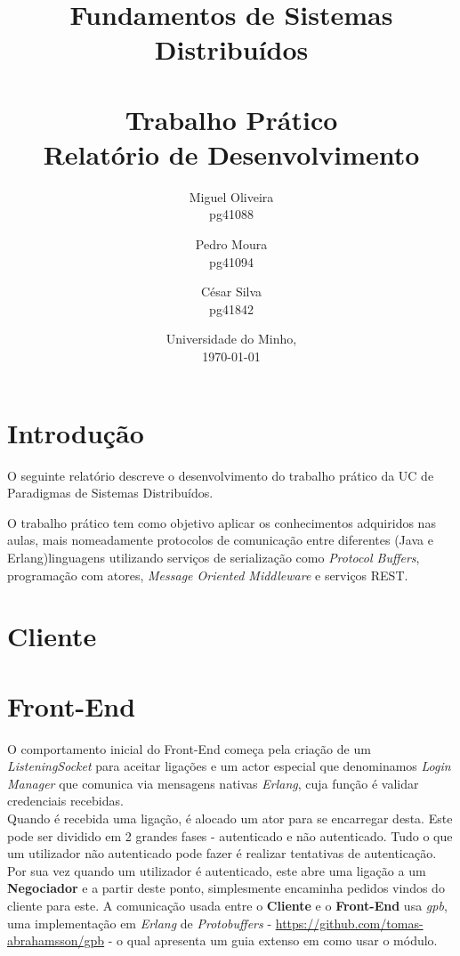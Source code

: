 \documentclass[12pt, a4paper]{report}
\begin{document}
\title{
    Fundamentos de Sistemas Distribuídos\\
    \textbf{\\Trabalho Prático}
    \large{\\Relatório de Desenvolvimento}
}

\author{
    Miguel Oliveira\\ pg41088
    \and Pedro Moura\\ pg41094
    \and César Silva\\ pg41842
}
\date{Universidade do Minho,\\\today}

\maketitle

\tableofcontents

\chapter{Introdução}
O seguinte relatório descreve o desenvolvimento do trabalho prático da UC de Paradigmas de Sistemas Distribuídos.

O trabalho prático tem como objetivo aplicar os conhecimentos adquiridos nas aulas, mais nomeadamente protocolos de comunicação entre diferentes  (Java e Erlang)linguagens utilizando serviços de serialização como \textit{Protocol Buffers}, programação com atores, \textit{Message Oriented Middleware} e serviços REST.


\chapter{Cliente}

\chapter{Front-End}

O comportamento inicial do Front-End começa pela criação de um
\textit{ListeningSocket} para aceitar ligações e um actor especial que 
denominamos \textit{Login Manager} que comunica via mensagens nativas
\textit{Erlang}, cuja função é validar credenciais recebidas. \\
Quando é recebida uma ligação, é alocado um ator para se encarregar desta.
Este pode ser dividido em 2 grandes fases - autenticado e não autenticado.
Tudo o que um utilizador não autenticado pode fazer é realizar tentativas de
autenticação. Por sua vez quando um utilizador é autenticado, este abre uma
ligação a um \textbf{Negociador} e a partir deste ponto, simplesmente encaminha
pedidos vindos do cliente para este. A comunicação usada entre
o \textbf{Cliente} e o \textbf{Front-End} usa \textit{gpb}, uma implementação em
\textit{Erlang} de \textit{Protobuffers}
- \url{https://github.com/tomas-abrahamsson/gpb} - o qual apresenta um guia
extenso em como usar o módulo.
\end{document}
